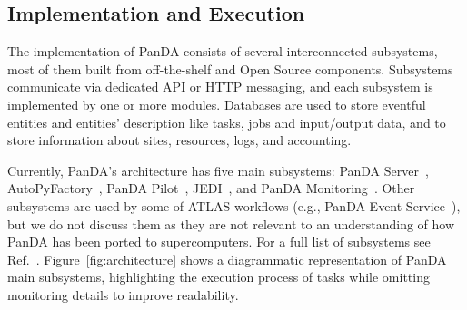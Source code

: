 \subsection{Implementation and Execution}
\label{ssec:panda_arch}


The implementation of PanDA consists of several interconnected subsystems, most
of them built from off-the-shelf and Open Source components. Subsystems
communicate via dedicated API or HTTP messaging, and each subsystem is
implemented by one or more modules. Databases are used to store eventful
entities and entities' description like tasks, jobs and %
input/output data, and to store information about sites,
resources, logs, and accounting.

Currently, PanDA's architecture has five main subsystems: PanDA
Server~\cite{maeno2011overview},
AutoPyFactory~\cite{caballero2012autopyfactory}, PanDA
Pilot~\cite{nilsson2011atlas}, JEDI~\cite{borodin2015scaling}, and PanDA
Monitoring~\cite{klimentov2011atlas}. Other subsystems are used by some of
ATLAS workflows (e.g., PanDA Event Service~\cite{calafiura2015atlas}), but we
do not discuss them as they are  not relevant to  an understanding of how
PanDA has been ported to supercomputers. For a full list of subsystems see
Ref.~\cite{panda-wiki_url}. Figure~\ref{fig:architecture} shows a diagrammatic
representation of PanDA main subsystems, highlighting the execution process of
tasks while omitting monitoring details to improve readability.

